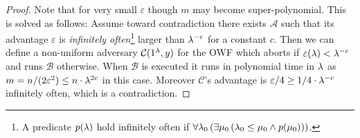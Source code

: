 \begin{proof}
	Note that for very small $\varepsilon$ though $m$ may become super-polynomial.
	This is solved as follows:
	Assume toward contradiction there exists $\mathcal{A}$ such that its advantage $\varepsilon$ is \textit{infinitely often}\footnote{A predicate $p(\lambda)$ hold infinitely often if $\forall \lambda_0 \left( \exists \mu_0 \left( \lambda_0 \leq \mu_0 \wedge  p(\mu_0) \right) \right)$.} larger than $\lambda^{-c}$ for a constant $c$.
	Then we can define a non-uniform adversary $\mathcal{C}(1^\lambda, y)$ for the OWF which aborts if $\varepsilon(\lambda) < \lambda^{-c}$ and runs $\mathcal{B}$ otherwise.
	When $\mathcal{B}$ is executed it runs in polynomial time in $\lambda$ as $m = n/(2\varepsilon^2) \leq n \cdot \lambda^{2c}$ in this case. Moreover $\mathcal{C}$'s advantage is $\varepsilon/4 \geq 1/4 \cdot \lambda^{-c}$ infinitely often, which is a contradiction.
\end{proof}